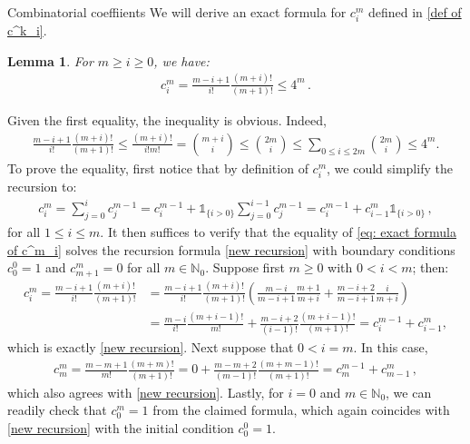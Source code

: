 \documentclass[a4paper,reqno,11pt]{amsart}
\makeatletter
\def\subsection{\@startsection{subsection}{2}%
  \z@{.5\linespacing\@plus.7\linespacing}{-.5em}%
  {\normalfont\bfseries}}
\renewenvironment{proof}[1][\proofname]{\par
\pushQED{\qed}%
\normalfont \topsep4\p@\@plus4\p@\relax
\trivlist
\item[\hskip\labelsep
\bfseries
#1\@addpunct{.}]\ignorespaces
}{%
\popQED\endtrivlist\@endpefalse
}
\numberwithin{equation}{section}
\theoremstyle{mytheorem}
\newtheorem{lemma}[theorem]{Lemma}
\newcommand{\bbN}{{\ensuremath{\mathbb N}} }
\newcommand{\ind}{\mathds{1}}
\newcommand\ra{\left(}
\newcommand\rb{\right)}
\newcommand{\f}{\frac}
\makeatother
\begin{document}
{\subsection{Combinatorial coeffiients}
We will derive an exact formula for $c^m_i$ defined in \eqref{def of c^k_i}.
\begin{lemma}\label{combinatorial}
For $m\ge i\ge 0$, we have:
\begin{align}\label{eq: exact formula of c^m_i}
    c^m_i = \f{m-i+1}{i!}\f{(m+i)!}{(m+1)!} \le 4^m \,.
\end{align}
\end{lemma}
\begin{proof}
    Given the first equality, the inequality is obvious. Indeed, 
    \begin{align*}
        \f{m-i+1}{i!}\f{(m+i)!}{(m+1)!}
        \le 
        \f{(m+i)!}{i!m!}
        = {m+i \choose i}
        \le {2m \choose i}
        \le \sum_{0\le i\le 2m}{2m\choose i}
        \le 4^m.
    \end{align*}
    To prove the equality, first notice that by definition of $c^m_i$, we could simplify the recursion to:
    \begin{align}\label{new recursion}
        c^{m}_{i}
        =
        \sum^{i}_{j=0}c^{m-1}_j
        =
        c^{m-1}_{i} + \ind_{\{i>0\}}\sum^{i-1}_{j=0}c^{m-1}_j
        =
        c^{m-1}_{i} + c^{m}_{i-1}\ind_{\{i>0\}} \,,
    \end{align}
    for all $1\le i\le m$. It then suffices to verify that the equality of \eqref{eq: exact formula of c^m_i} solves the recursion formula \eqref{new recursion} with boundary conditions $c^0_0=1$ and $c^m_{m+1}=0$ for all $m\in\bbN_0$. Suppose first $m\ge 0$ with $0< i< m$; then:
    \begin{align*}
        c^m_i=\f{m-i+1}{i!} \f{(m+i)!}{(m+1)!} & = 
        \f{m-i+1}{i!} \f{(m+i)!}{(m+1)!} \ra \f{m-i}{m-i+1} \f{m+1}{m+i} + \f{m-i+2}{m-i+1} \f{i}{m+i} \rb \\
        & = \f{m-i}{i!} \f{(m+i-1)!}{m!} + \f{m-i+2}{(i-1)!} \f{(m+i-1)!}{(m+1)!}
        =c^{m-1}_i+c^m_{i-1},
    \end{align*}
    which is exactly \eqref{new recursion}. Next suppose that $0 < i=m$. In this case,
        \begin{align*}
        c^m_m = \f{m -m+1}{m!} \f{(m+m)!}{(m+1)!} = 0+ \f{m-m+2}{(m-1)!} \f{(m+m-1)!}{(m+1)!} 
        =c^{m-1}_m + c^m_{m-1} \,,
    \end{align*}
    which also agrees with \eqref{new recursion}. Lastly, for $i=0$ and $m\in\bbN_0$, we can readily check that $c^m_0=1$ from the claimed formula,
    which again coincides with \eqref{new recursion} with the initial condition $c^0_0=1$.
\end{proof}





}
\end{document}
